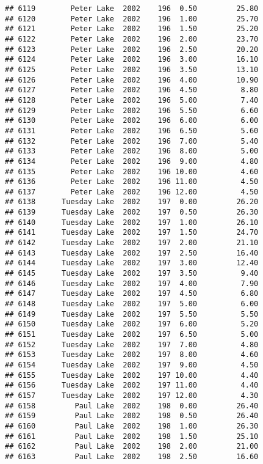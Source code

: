 \documentclass[
]{article}
\begin{document}
\begin{verbatim}
## 6119        Peter Lake  2002    196  0.50         25.80
## 6120        Peter Lake  2002    196  1.00         25.70
## 6121        Peter Lake  2002    196  1.50         25.20
## 6122        Peter Lake  2002    196  2.00         23.70
## 6123        Peter Lake  2002    196  2.50         20.20
## 6124        Peter Lake  2002    196  3.00         16.10
## 6125        Peter Lake  2002    196  3.50         13.10
## 6126        Peter Lake  2002    196  4.00         10.90
## 6127        Peter Lake  2002    196  4.50          8.80
## 6128        Peter Lake  2002    196  5.00          7.40
## 6129        Peter Lake  2002    196  5.50          6.60
## 6130        Peter Lake  2002    196  6.00          6.00
## 6131        Peter Lake  2002    196  6.50          5.60
## 6132        Peter Lake  2002    196  7.00          5.40
## 6133        Peter Lake  2002    196  8.00          5.00
## 6134        Peter Lake  2002    196  9.00          4.80
## 6135        Peter Lake  2002    196 10.00          4.60
## 6136        Peter Lake  2002    196 11.00          4.50
## 6137        Peter Lake  2002    196 12.00          4.50
## 6138      Tuesday Lake  2002    197  0.00         26.20
## 6139      Tuesday Lake  2002    197  0.50         26.30
## 6140      Tuesday Lake  2002    197  1.00         26.10
## 6141      Tuesday Lake  2002    197  1.50         24.70
## 6142      Tuesday Lake  2002    197  2.00         21.10
## 6143      Tuesday Lake  2002    197  2.50         16.40
## 6144      Tuesday Lake  2002    197  3.00         12.40
## 6145      Tuesday Lake  2002    197  3.50          9.40
## 6146      Tuesday Lake  2002    197  4.00          7.90
## 6147      Tuesday Lake  2002    197  4.50          6.80
## 6148      Tuesday Lake  2002    197  5.00          6.00
## 6149      Tuesday Lake  2002    197  5.50          5.50
## 6150      Tuesday Lake  2002    197  6.00          5.20
## 6151      Tuesday Lake  2002    197  6.50          5.00
## 6152      Tuesday Lake  2002    197  7.00          4.80
## 6153      Tuesday Lake  2002    197  8.00          4.60
## 6154      Tuesday Lake  2002    197  9.00          4.50
## 6155      Tuesday Lake  2002    197 10.00          4.40
## 6156      Tuesday Lake  2002    197 11.00          4.40
## 6157      Tuesday Lake  2002    197 12.00          4.30
## 6158         Paul Lake  2002    198  0.00         26.40
## 6159         Paul Lake  2002    198  0.50         26.40
## 6160         Paul Lake  2002    198  1.00         26.30
## 6161         Paul Lake  2002    198  1.50         25.10
## 6162         Paul Lake  2002    198  2.00         21.00
## 6163         Paul Lake  2002    198  2.50         16.60

\end{verbatim}
\end{document}
